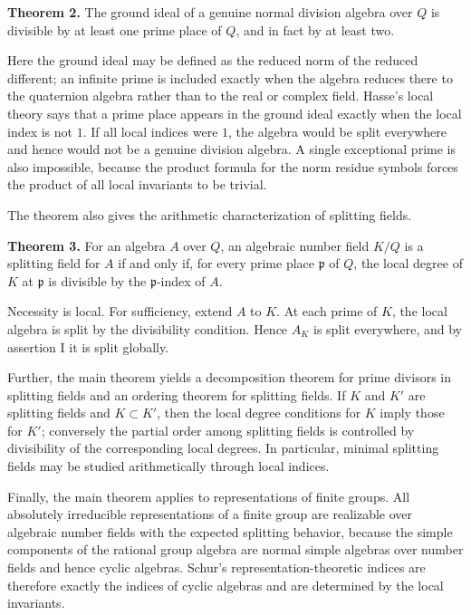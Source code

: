 \documentclass[11pt]{article}
\begin{document}
\textbf{Theorem 2.} The ground ideal of a genuine normal division
algebra over \(Q\) is divisible by at least one prime place of \(Q\),
and in fact by at least two.

Here the ground ideal may be defined as the reduced norm of the reduced
different; an infinite prime is included exactly when the algebra
reduces there to the quaternion algebra rather than to the real or
complex field. Hasse's local theory says that a prime place appears in
the ground ideal exactly when the local index is not \(1\). If all local
indices were \(1\), the algebra would be split everywhere and hence
would not be a genuine division algebra. A single exceptional prime is
also impossible, because the product formula for the norm residue
symbols forces the product of all local invariants to be trivial.

The theorem also gives the arithmetic characterization of splitting
fields.

\textbf{Theorem 3.} For an algebra \(A\) over \(Q\), an algebraic number
field \(K/Q\) is a splitting field for \(A\) if and only if, for every
prime place \(\mathfrak p\) of \(Q\), the local degree of \(K\) at
\(\mathfrak p\) is divisible by the \(\mathfrak p\)-index of \(A\).

Necessity is local. For sufficiency, extend \(A\) to \(K\). At each
prime of \(K\), the local algebra is split by the divisibility
condition. Hence \(A_K\) is split everywhere, and by assertion I it is
split globally.

Further, the main theorem yields a decomposition theorem for prime
divisors in splitting fields and an ordering theorem for splitting
fields. If \(K\) and \(K'\) are splitting fields and \(K\subset K'\),
then the local degree conditions for \(K\) imply those for \(K'\);
conversely the partial order among splitting fields is controlled by
divisibility of the corresponding local degrees. In particular, minimal
splitting fields may be studied arithmetically through local indices.

Finally, the main theorem applies to representations of finite groups.
All absolutely irreducible representations of a finite group are
realizable over algebraic number fields with the expected splitting
behavior, because the simple components of the rational group algebra
are normal simple algebras over number fields and hence cyclic algebras.
Schur's representation-theoretic indices are therefore exactly the
indices of cyclic algebras and are determined by the local invariants.
\end{document}
